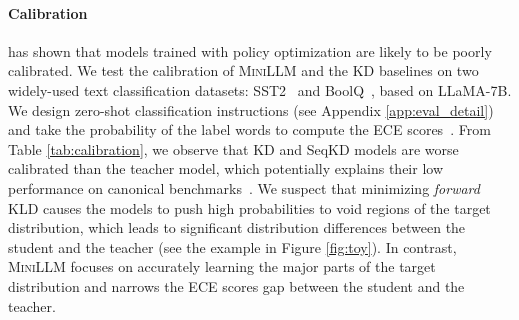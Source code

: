 \documentclass{article}
\begin{document}
\paragraph{Calibration}

\cite{gpt4} has shown that models trained with policy optimization are likely to be poorly calibrated. We test the calibration of \textsc{MiniLLM} and the KD baselines on two widely-used text classification datasets: SST2~\citep{sst-2} and BoolQ~\citep{boolq}, based on LLaMA-7B. We design zero-shot classification instructions (see Appendix \ref{app:eval_detail}) and take the probability of the label words to compute the ECE scores~\citep{ece}. From Table \ref{tab:calibration}, we observe that KD and SeqKD models are worse calibrated than the teacher model, which potentially explains their low performance on canonical benchmarks~\citep{false_imitate}. We suspect that minimizing \textit{forward} KLD causes the models to push high probabilities to void regions of the target distribution, which leads to significant distribution differences between the student and the teacher (see the example in Figure \ref{fig:toy}). In contrast, \textsc{MiniLLM} focuses on accurately learning the major parts of the target distribution and narrows the ECE scores gap between the student and the teacher.
\end{document}
